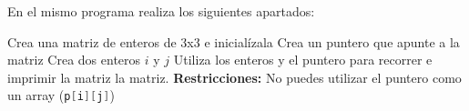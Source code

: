 \documentclass{tareas}
\begin{document}
\begin{problem}[Matrices]
\begin{statement}
	En el mismo programa realiza los siguientes apartados:
	\begin{subproblems}
		\subp Crea una matriz de enteros de 3x3 e inicialízala
		\subp Crea un puntero que apunte a la matriz
		\subp Crea dos enteros $i$ y $j$
		\subp Utiliza los enteros y el puntero para recorrer e imprimir
		la matriz la matriz. \textbf{Restricciones:} No puedes utilizar
		el puntero como un array (\lstinline[language=C]|p[i][j]|)
	\end{subproblems}
\end{statement}
\end{problem}
\end{document}
